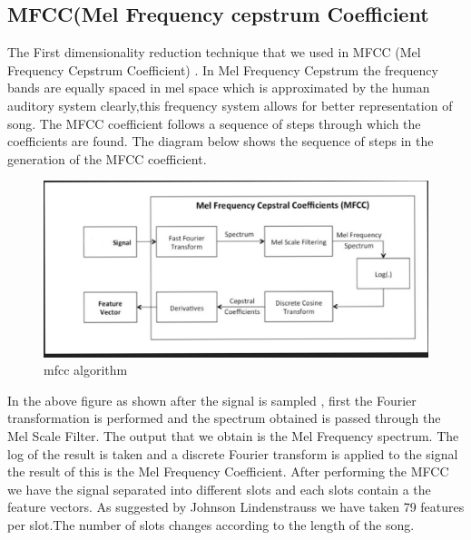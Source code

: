 \documentclass[12pt]{article}
\begin{document}
\subsection{MFCC(Mel Frequency cepstrum Coefficient }
The First dimensionality reduction technique that we used in MFCC (Mel Frequency Cepstrum Coefficient) \cite{logmfcc}. In Mel Frequency Cepstrum the frequency bands are equally spaced in mel space which is approximated by the human auditory system clearly,this frequency system allows for better representation of song.
The MFCC coefficient follows a sequence of steps through which the coefficients are found.
The diagram below shows the sequence of steps in the generation of the MFCC coefficient.
\begin{figure}[H]
\center
\includegraphics [scale=0.5]{mfcc.png}
\caption{mfcc algorithm}
\end{figure}
In the above figure as shown after the signal is sampled , first the Fourier transformation is performed and the spectrum obtained is passed through the Mel Scale Filter. The output that we obtain is the Mel Frequency spectrum.
The log of the result is taken and a discrete Fourier transform is applied to the signal the result of this is the Mel Frequency Coefficient.
After performing the MFCC we have the signal separated into different slots and each slots contain a the feature vectors. As suggested by Johnson Lindenstrauss we have taken 79 features per slot.The number of slots changes according to the length of the song.
\end{document}
